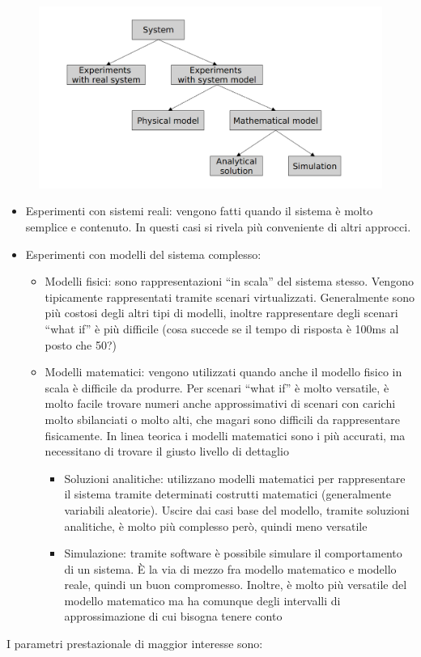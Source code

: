 \documentclass{article}
\begin{document}
		\begin{figure}[ht]
			\centering
			\includegraphics[width=0.7\linewidth]{SAC_D1_approaches}
			\label{fig:sacd1approaches}
		\end{figure}
		
		\begin{itemize}
			\item Esperimenti con sistemi reali: vengono fatti quando il sistema è molto semplice e contenuto. In questi casi si rivela più conveniente di altri approcci.
			\item Esperimenti con modelli del sistema complesso:
			\begin{itemize}
				\item Modelli fisici: sono rappresentazioni “in scala” del sistema stesso. Vengono tipicamente
				rappresentati tramite scenari virtualizzati. Generalmente sono più costosi degli altri tipi di
				modelli, inoltre rappresentare degli scenari “what if” è più difficile (cosa succede se il tempo
				di risposta è 100ms al posto che 50?)
				\item Modelli matematici: vengono utilizzati quando anche il modello fisico in scala è difficile da
				produrre. Per scenari “what if” è molto versatile, è molto facile trovare numeri anche
				approssimativi di scenari con carichi molto sbilanciati o molto alti, che magari sono difficili
				da rappresentare fisicamente. In linea teorica i modelli matematici sono i più
				accurati, ma necessitano di trovare il giusto livello di dettaglio
				\begin{itemize}
					\item Soluzioni analitiche: utilizzano modelli matematici per rappresentare il sistema tramite
					determinati costrutti matematici (generalmente variabili aleatorie). Uscire dai casi base
					del modello, tramite soluzioni analitiche, è molto più complesso però, quindi meno
					versatile
					\item Simulazione: tramite software è possibile simulare il comportamento di un sistema. È la via di mezzo fra modello matematico e modello reale, quindi un buon compromesso.
					Inoltre, è molto più versatile del modello matematico ma ha comunque degli intervalli di approssimazione di cui bisogna tenere conto
				\end{itemize}
			\end{itemize}
		\end{itemize}
		\newpage
		I parametri prestazionale di maggior interesse sono:
		
\end{document}
